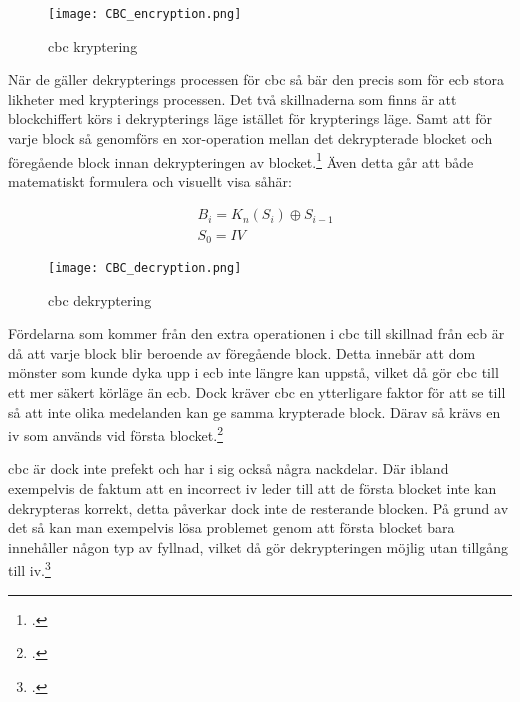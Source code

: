 \begin{figure}[H]
    \texttt{[image: CBC\_encryption.png]}
    \caption{\acrlong{cbc} kryptering \cite{cbc-mode-enc-ref}}
    \label{fig:cbc-mode-enc}
\end{figure}

När de gäller dekrypterings processen för \acrshort{cbc} så bär den precis som för
\acrshort{ecb} stora likheter med krypterings processen. Det två skillnaderna som
finns är att blockchiffert körs i dekrypterings läge istället för krypterings läge.
Samt att för varje block så genomförs en \gls{xor}-operation mellan det dekrypterade
blocket och föregående block innan dekrypteringen av blocket.\footcite{modesofoperation}
Även detta går att både matematiskt formulera och visuellt visa såhär:

\begin{equation}
    \label{eq:cbc-decryption}
    \begin{aligned}
        &B_i = K_n(S_i) \oplus S_{i-1}\\\nonumber
        &S_0 = IV
    \end{aligned}
\end{equation}

\begin{figure}[H]
    \texttt{[image: CBC\_decryption.png]}
    \caption{\acrlong{cbc} dekryptering \cite{cbc-mode-dec-ref}}
    \label{fig:cbc-mode-dec}
\end{figure}

Fördelarna som kommer från den extra operationen i \acrshort{cbc} till skillnad
från \acrshort{ecb} är då att varje block blir beroende av föregående block.
Detta innebär att dom mönster som kunde dyka upp i \acrshort{ecb} inte längre
kan uppstå, vilket då gör \acrshort{cbc} till ett mer säkert körläge än \acrshort{ecb}.
Dock kräver cbc en ytterligare faktor för att se till så att inte olika medelanden
kan ge samma krypterade block. Därav så krävs en \acrfull{iv} som används vid första
blocket.\footcite{modesofoperation}

\acrshort{cbc} är dock inte prefekt och har i sig också några nackdelar. Där ibland
exempelvis de faktum att en incorrect \acrshort{iv} leder till att de första blocket
inte kan dekrypteras korrekt, detta påverkar dock inte de resterande blocken. På grund
av det så kan man exempelvis lösa problemet genom att första blocket bara innehåller
någon typ av fyllnad, vilket då gör dekrypteringen möjlig utan tillgång till \acrshort{iv}.\footcite{modesofoperation}

